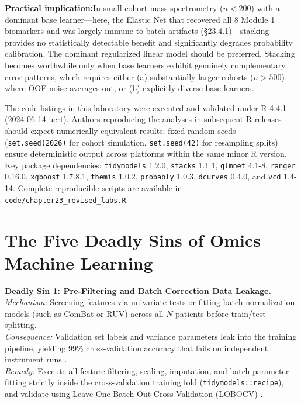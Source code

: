 \documentclass[11pt,oneside]{book}
\begin{document}
\textbf{Practical implication:}\enspace In small-cohort mass spectrometry ($n < 200$) with a dominant base learner---here, the Elastic Net that recovered all 8 Module 1 biomarkers and was largely immune to batch artifacts (\S23.4.1)---stacking provides no statistically detectable benefit and significantly degrades probability calibration. The dominant regularized linear model should be preferred. Stacking becomes worthwhile only when base learners exhibit genuinely complementary error patterns, which requires either (a) substantially larger cohorts ($n > 500$) where OOF noise averages out, or (b) explicitly diverse base learners.

\begin{notebox}[top=3pt, bottom=3pt, before skip=3pt, after skip=3pt, title={Computational Environment and Reproducibility Parameters}]
\small
The code listings in this laboratory were executed and validated under R 4.4.1 (2024-06-14 ucrt). Authors reproducing the analyses in subsequent R releases should expect numerically equivalent results; fixed random seeds (\texttt{set.seed(2026)} for cohort simulation, \texttt{set.seed(42)} for resampling splits) ensure deterministic output across platforms within the same minor R version. Key package dependencies: \texttt{tidymodels} 1.2.0, \texttt{stacks} 1.1.1, \texttt{glmnet} 4.1-8, \texttt{ranger} 0.16.0, \texttt{xgboost} 1.7.8.1, \texttt{themis} 1.0.2, \texttt{probably} 1.0.3, \texttt{dcurves} 0.4.0, and \texttt{vcd} 1.4-14. Complete reproducible scripts are available in \texttt{code/chapter23\_revised\_labs.R}.
\end{notebox}

\clearpage
\section{The Five Deadly Sins of Omics Machine Learning}

\begin{pitfallbox}[top=3pt, bottom=3pt, before skip=3pt, after skip=3pt]
\textbf{Deadly Sin 1: Pre-Filtering and Batch Correction Data Leakage.}\\
\textit{Mechanism:} Screening features via univariate tests or fitting batch normalization models (such as ComBat or RUV) across all $N$ patients before train/test splitting.\\
\textit{Consequence:} Validation set labels and variance parameters leak into the training pipeline, yielding 99\% cross-validation accuracy that fails on independent instrument runs \cite{ambroise2002selection, broadhurst2006statistical}.\\
\textit{Remedy:} Execute all feature filtering, scaling, imputation, and batch parameter fitting strictly inside the cross-validation training fold (\texttt{tidymodels::recipe}), and validate using Leave-One-Batch-Out Cross-Validation (LOBOCV) \cite{kuhn2022tidymodels}.
\end{pitfallbox}
\end{document}
